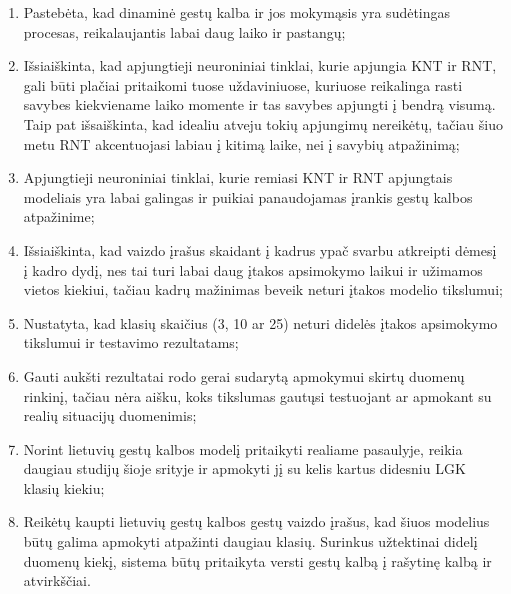 \documentclass{VUMIFPSbakalaurinis}
\begin{document}
\begin{enumerate}
	\item Pastebėta, kad dinaminė gestų kalba ir jos mokymąsis yra sudėtingas procesas, reikalaujantis labai daug laiko ir pastangų;
	\item Išsiaiškinta, kad apjungtieji neuroniniai tinklai, kurie apjungia KNT ir RNT, gali būti plačiai pritaikomi tuose uždaviniuose, kuriuose reikalinga rasti savybes kiekviename laiko momente ir tas savybes apjungti į bendrą visumą. Taip pat išsaiškinta, kad idealiu atveju tokių apjungimų nereikėtų, tačiau šiuo metu RNT akcentuojasi labiau į kitimą laike, nei į savybių atpažinimą;
	\item Apjungtieji neuroniniai tinklai, kurie remiasi KNT ir RNT apjungtais modeliais yra labai galingas ir puikiai panaudojamas įrankis gestų kalbos atpažinime;
	\item Išsiaiškinta, kad vaizdo įrašus skaidant į kadrus ypač svarbu atkreipti dėmesį į kadro dydį, nes tai turi labai daug įtakos apsimokymo laikui ir užimamos vietos kiekiui, tačiau kadrų mažinimas beveik neturi įtakos modelio tikslumui;
	\item Nustatyta, kad klasių skaičius (3, 10 ar 25) neturi didelės įtakos apsimokymo tikslumui ir testavimo rezultatams;
	\item Gauti aukšti rezultatai rodo gerai sudarytą apmokymui skirtų duomenų rinkinį, tačiau nėra aišku, koks tikslumas gautųsi testuojant ar apmokant su realių situacijų duomenimis;
	\item Norint lietuvių gestų kalbos modelį pritaikyti realiame pasaulyje, reikia daugiau studijų šioje srityje ir apmokyti jį su kelis kartus didesniu LGK klasių kiekiu;
	\item Reikėtų kaupti lietuvių gestų kalbos gestų vaizdo įrašus, kad šiuos modelius būtų galima apmokyti atpažinti daugiau klasių. Surinkus užtektinai didelį duomenų kiekį, sistema būtų pritaikyta versti gestų kalbą į rašytinę kalbą ir atvirkščiai.
\end{enumerate}
%

\printbibliography[heading=bibintoc]  %
\end{document}
